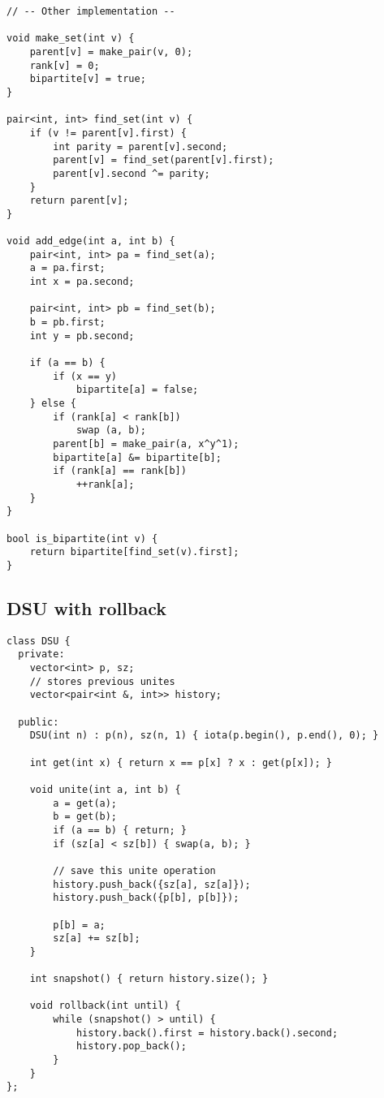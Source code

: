 \documentclass[10pt]{article}
\begin{document}
\begin{multicols*}{2}
\begin{lstlisting}[style=compactcpp]
// -- Other implementation --

void make_set(int v) {
    parent[v] = make_pair(v, 0);
    rank[v] = 0;
    bipartite[v] = true;
}

pair<int, int> find_set(int v) {
    if (v != parent[v].first) {
        int parity = parent[v].second;
        parent[v] = find_set(parent[v].first);
        parent[v].second ^= parity;
    }
    return parent[v];
}

void add_edge(int a, int b) {
    pair<int, int> pa = find_set(a);
    a = pa.first;
    int x = pa.second;

    pair<int, int> pb = find_set(b);
    b = pb.first;
    int y = pb.second;

    if (a == b) {
        if (x == y)
            bipartite[a] = false;
    } else {
        if (rank[a] < rank[b])
            swap (a, b);
        parent[b] = make_pair(a, x^y^1);
        bipartite[a] &= bipartite[b];
        if (rank[a] == rank[b])
            ++rank[a];
    }
}

bool is_bipartite(int v) {
    return bipartite[find_set(v).first];
}

\end{lstlisting}

\subsection{DSU with rollback}

\begin{lstlisting}[style=compactcpp]
class DSU {
  private:
	vector<int> p, sz;
	// stores previous unites
	vector<pair<int &, int>> history;

  public:
	DSU(int n) : p(n), sz(n, 1) { iota(p.begin(), p.end(), 0); }

	int get(int x) { return x == p[x] ? x : get(p[x]); }

	void unite(int a, int b) {
		a = get(a);
		b = get(b);
		if (a == b) { return; }
		if (sz[a] < sz[b]) { swap(a, b); }

		// save this unite operation
		history.push_back({sz[a], sz[a]});
		history.push_back({p[b], p[b]});

		p[b] = a;
		sz[a] += sz[b];
	}

	int snapshot() { return history.size(); }

	void rollback(int until) {
		while (snapshot() > until) {
			history.back().first = history.back().second;
			history.pop_back();
		}
	}
};

\end{lstlisting}


\end{multicols*}
\end{document}
